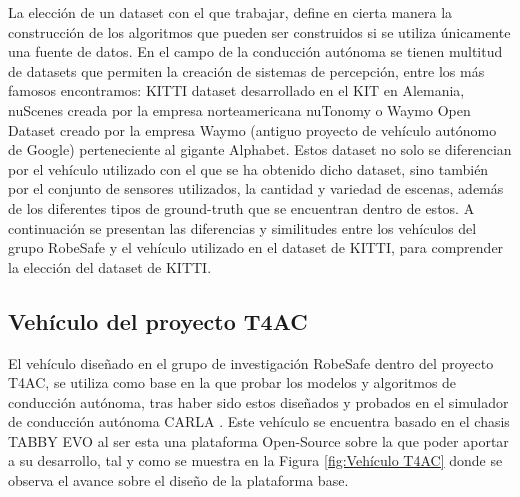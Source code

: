 La elección de un dataset con el que trabajar, define en cierta manera la construcción de los algoritmos que pueden ser construidos si se utiliza únicamente una fuente de datos. En el campo de la conducción autónoma se tienen multitud de datasets que permiten la creación de sistemas de percepción, entre los más famosos encontramos: KITTI dataset \cite{kitti_dataset} desarrollado en el \ac{KIT} en Alemania, nuScenes \cite{nuscenes_dataset} creada por la empresa norteamericana nuTonomy o Waymo Open Dataset \cite{waymo_dataset} creado por la empresa Waymo (antiguo proyecto de vehículo autónomo de Google) perteneciente al gigante Alphabet. Estos dataset no solo se diferencian por el vehículo utilizado con el que se ha obtenido dicho dataset, sino también por el conjunto de sensores utilizados, la cantidad y variedad de escenas, además de los diferentes tipos de ground-truth que se encuentran dentro de estos. A continuación se presentan las diferencias y similitudes entre los vehículos del grupo RobeSafe y el vehículo utilizado en el dataset de KITTI, para comprender la elección del dataset de KITTI.

\subsection{Vehículo del proyecto T4AC}
\label{sec:Vehículo del proyecto T4AC}

El vehículo diseñado en el grupo de investigación RobeSafe dentro del proyecto \acl{T4AC}, se utiliza como base en la que probar los modelos y algoritmos de conducción autónoma, tras haber sido estos diseñados y probados en el simulador de conducción autónoma CARLA \cite{carla}. Este vehículo se encuentra basado en el chasis TABBY EVO al ser esta una plataforma Open-Source sobre la que poder aportar a su desarrollo, tal y como se muestra en la Figura \ref{fig:Vehículo T4AC} donde se observa el avance sobre el diseño de la plataforma base. 

